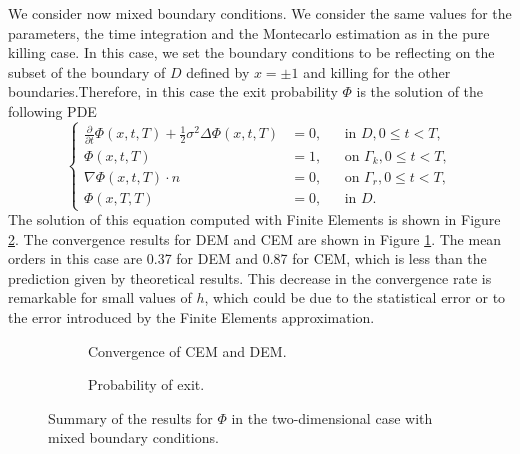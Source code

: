 We consider now mixed boundary conditions. We consider the same values for the parameters, the time integration and the Montecarlo estimation as in the pure killing case. In this case, we set the boundary conditions to be reflecting on the subset of the boundary of $D$ defined by $x = \pm 1$ and killing for the other boundaries.Therefore, in this case the exit probability $\Phi$ is the solution of the following PDE
\begin{equation}\label{eq:PDEPhi2DRefl}
	\left \{
  	\begin{aligned}
	\frac{\partial}{\partial t} \Phi(x,t,T) + \frac{1}{2} \sigma^2 \Delta \Phi(x,t,T) &= 0, && \text{in } D, 0 \leq t < T,\\
	\Phi(x,t,T) &= 1, && \text{on } \Gamma_k, 0 \leq t < T,\\
	\nabla \Phi(x,t,T) \cdot n &= 0, && \text{on } \Gamma_r, 0 \leq t < T,\\
	\Phi(x,T,T) &= 0, && \text{in } D.
  	\end{aligned} \right.
\end{equation}
The solution of this equation computed with Finite Elements is shown in Figure \ref{fig:PhiExact2DRefl}. The convergence results for DEM and CEM are shown in Figure \ref{fig:ReflTwoDPhi}. The mean orders in this case are 0.37 for DEM and 0.87 for CEM, which is less than the prediction given by theoretical results. This decrease in the convergence rate is remarkable for small values of $h$, which could be due to the statistical error or to the error introduced by the Finite Elements approximation.

\begin{figure}[t]
    \centering
    \begin{subfigure}{0.49\linewidth}
        \centering
        \resizebox{1\linewidth}{!}{ }  
        \caption{Convergence of CEM and DEM.}
        \label{fig:ReflTwoDPhi}
    \end{subfigure}
    \begin{subfigure}{0.49\linewidth}
        \centering
        \resizebox{1\linewidth}{!}{ }  
        \caption{Probability of exit.}
        \label{fig:PhiExact2DRefl}
    \end{subfigure}    
    \caption{Summary of the results for $\Phi$ in the two-dimensional case with mixed boundary conditions.}
    \label{fig:OrdersTwoDKillPhi}
\end{figure}
